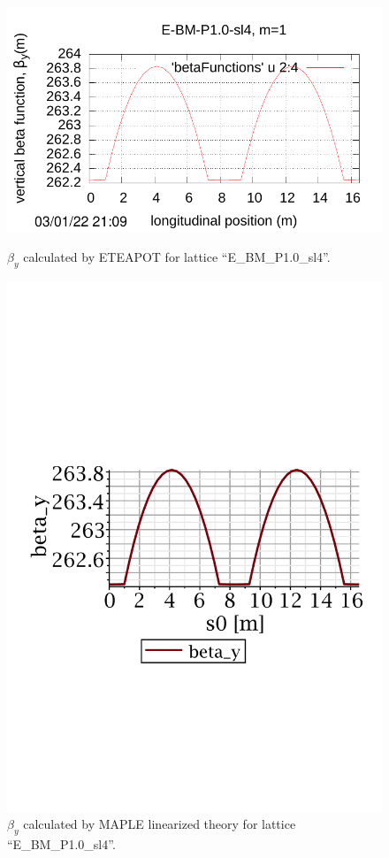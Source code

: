 \documentclass[]{article}
\begin{document}
\begin{figure}[htbp]
\hspace{-0.6cm}
\begin{minipage}[b]{0.49\linewidth}
\centering
\includegraphics[scale=0.6]{pdf/Fig_II-3.pdf}
\caption{$\beta_y$ calculated by ETEAPOT 
for lattice ``E\_BM\_P1.0\_sl4''.}
\label{fig:UAL_P1.0_betay}
\end{minipage}
%
%
\begin{minipage}[b]{0.49\linewidth}
\centering
\includegraphics[scale=0.45]{pdf/E_BM_P1p0_2-betay.pdf}
\caption{$\beta_y$ calculated by MAPLE linearized 
theory for lattice ``E\_BM\_P1.0\_sl4''.}
\label{fig:RT_P1.0_betay}
\end{minipage}
\end{figure}
%
\end{document}
